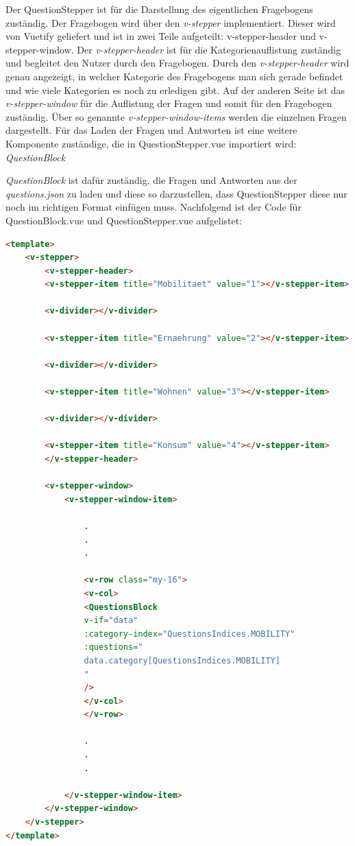 Der QuestionStepper ist für die Darstellung des eigentlichen Fragebogens zuständig.
Der Fragebogen wird über den \textit{v-stepper} implementiert.
Dieser wird von Vuetify geliefert und ist in zwei Teile aufgeteilt: v-stepper-header und v-stepper-window.
Der \textit{v-stepper-header} ist für die Kategorienauflistung zuständig und begleitet den Nutzer durch den Fragebogen.
Durch den \textit{v-stepper-header} wird genau angezeigt, in welcher Kategorie des Fragebogens man sich gerade befindet und wie viele Kategorien es noch zu erledigen gibt.
Auf der anderen Seite ist das \textit{v-stepper-window} für die Auflistung der Fragen und somit für den Fragebogen zuständig.
Über so genannte \textit{v-stepper-window-items} werden die einzelnen Fragen dargestellt.
Für das Laden der Fragen und Antworten ist eine weitere Komponente zuständige, die in QuestionStepper.vue importiert wird: \textit{QuestionBlock}

\textit{QuestionBlock} ist dafür zuständig, die Fragen und Antworten aus der \textit{questions.json} zu laden und diese so darzustellen, dass QuestionStepper diese nur noch im richtigen Format einfügen muss.
Nachfolgend ist der Code für QuestionBlock.vue und QuestionStepper.vue aufgelistet:

\begin{lstlisting}[language={html}, caption={QuestionStepper.vue}]
<template>
    <v-stepper>
        <v-stepper-header>
        <v-stepper-item title="Mobilitaet" value="1"></v-stepper-item>

        <v-divider></v-divider>

        <v-stepper-item title="Ernaehrung" value="2"></v-stepper-item>

        <v-divider></v-divider>

        <v-stepper-item title="Wohnen" value="3"></v-stepper-item>

        <v-divider></v-divider>

        <v-stepper-item title="Konsum" value="4"></v-stepper-item>
        </v-stepper-header>

        <v-stepper-window>
            <v-stepper-window-item>

                .
                .
                .

                <v-row class="my-16">
                <v-col>
                <QuestionsBlock
                v-if="data"
                :category-index="QuestionsIndices.MOBILITY"
                :questions="
                data.category[QuestionsIndices.MOBILITY]
                "
                />
                </v-col>
                </v-row>

                .
                .
                .

            </v-stepper-window-item>
        </v-stepper-window>
    </v-stepper>
</template>
\end{lstlisting}

